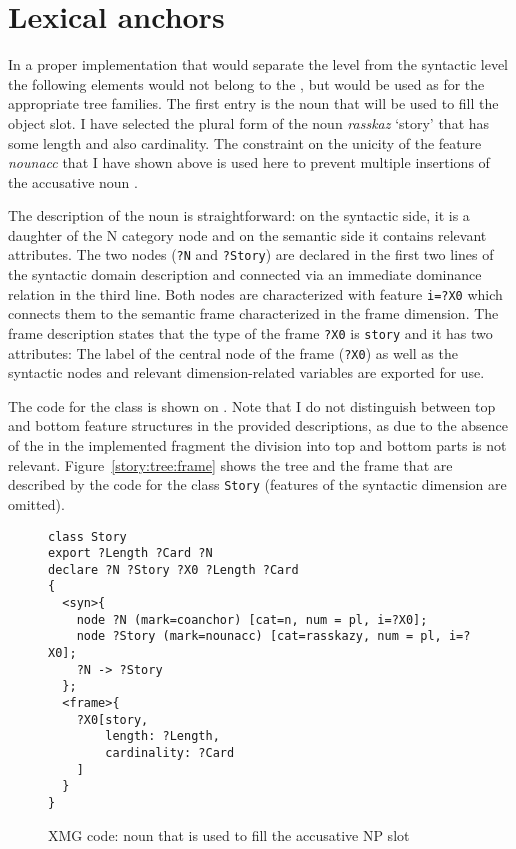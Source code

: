 \section{Lexical anchors}\largerpage[-1]
In a proper implementation that would separate the  level from the syntactic level the following elements would not belong to the , but would be used as  for the appropriate tree families. The first entry is the noun that will be used to fill the object slot. I have selected the plural form of the noun \textit{rasskaz} `story' that has some length and also cardinality. The constraint on the unicity of the feature \textit{nounacc} that I have shown above is used here to prevent multiple insertions of the accusative noun .

The description of the noun is straightforward: on the syntactic side, it is a daughter of the N category node and on the semantic side it contains relevant attributes. The two nodes (\texttt{?N} and \texttt{?Story}) are declared in the first two lines of the syntactic domain description and connected via an immediate dominance relation in the third line. Both nodes are characterized with feature \texttt{i=?X0} which connects them to the semantic frame characterized in the frame dimension. The frame description states that the type of the frame \texttt{?X0} is \texttt{story} and it has two attributes: The label of the central node of the frame (\texttt{?X0}) as well as the syntactic nodes and relevant dimension-related variables are exported for  use. 

The code for the class is shown on . Note that I do not distinguish between top and bottom feature structures in the provided descriptions, as due to the absence of the  in the implemented fragment the division into top and bottom parts is not relevant. Figure~\ref{story:tree:frame} shows the tree and the frame that are described by the code for the class \texttt{Story} (features of the syntactic dimension are omitted).

\begin{figure}
\begin{lstlisting}[style=xmg]
class Story
export ?Length ?Card ?N
declare ?N ?Story ?X0 ?Length ?Card
{
  <syn>{
    node ?N (mark=coanchor) [cat=n, num = pl, i=?X0];
    node ?Story (mark=nounacc) [cat=rasskazy, num = pl, i=?X0];
    ?N -> ?Story
  };
  <frame>{
    ?X0[story,
        length: ?Length,
        cardinality: ?Card
    ]
  }
}
\end{lstlisting}
\caption{XMG code: noun that is used to fill the accusative NP slot \label{xmg:noun}}
\end{figure}

